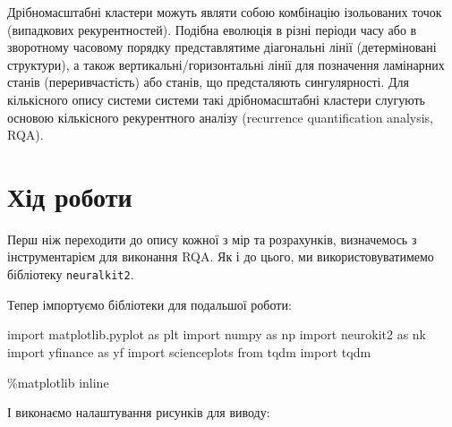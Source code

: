 \documentclass[
  letterpaper,
]{report}
\newenvironment{Shaded}{\begin{snugshade}}{\end{snugshade}}
\newcommand{\ImportTok}[1]{\textcolor[rgb]{0.00,0.46,0.62}{#1}}
\newcommand{\NormalTok}[1]{\textcolor[rgb]{0.00,0.23,0.31}{#1}}
\newcommand{\OperatorTok}[1]{\textcolor[rgb]{0.37,0.37,0.37}{#1}}
\begin{document}
Дрібномасштабні кластери можуть являти собою комбінацію ізольованих
точок (випадкових рекурентностей). Подібна еволюція в різні періоди часу
або в зворотному часовому порядку представлятиме діагональні лінії
(детерміновані структури), а також вертикальні/горизонтальні лінії для
позначення ламінарних станів (переривчастість) або станів, що
предсталяють сингулярності. Для кількісного опису системи системи такі
дрібномасштабні кластери слугують основою кількісного рекурентного
аналізу (recurrence quantification analysis, RQA).

\hypertarget{ux445ux456ux434-ux440ux43eux431ux43eux442ux438-2}{%
\section{Хід
роботи}\label{ux445ux456ux434-ux440ux43eux431ux43eux442ux438-2}}

Перш ніж переходити до опису кожної з мір та розрахунків, визначемось з
інструментарієм для виконання RQA. Як і до цього, ми використовуватимемо
бібліотеку \texttt{neuralkit2}.

Тепер імпортуємо бібліотеки для подальшої роботи:

\begin{Shaded}
\begin{Highlighting}[]
\ImportTok{import}\NormalTok{ matplotlib.pyplot }\ImportTok{as}\NormalTok{ plt }
\ImportTok{import}\NormalTok{ numpy }\ImportTok{as}\NormalTok{ np}
\ImportTok{import}\NormalTok{ neurokit2 }\ImportTok{as}\NormalTok{ nk}
\ImportTok{import}\NormalTok{ yfinance }\ImportTok{as}\NormalTok{ yf}
\ImportTok{import}\NormalTok{ scienceplots}
\ImportTok{from}\NormalTok{ tqdm }\ImportTok{import}\NormalTok{ tqdm}

\OperatorTok{\%}\NormalTok{matplotlib inline}
\end{Highlighting}
\end{Shaded}

І виконаємо налаштування рисунків для виводу:
\end{document}
